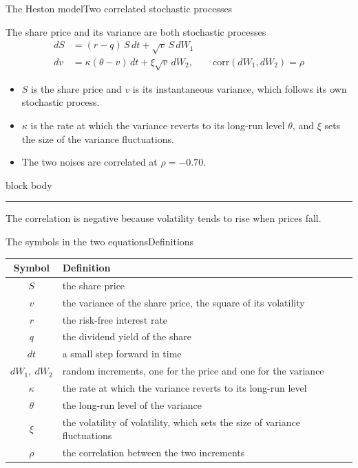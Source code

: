 \documentclass[aspectratio=169,11pt]{beamer}
\newcommand{\sigcallout}[1]{%
  \vfill
  \begin{beamercolorbox}[wd=\linewidth,sep=0.7em,rounded=true]{block body}
    {\color{sigblue}\rule{0.9ex}{0.9ex}}\hspace{0.5em}#1
  \end{beamercolorbox}%
}
\newcommand{\sigtable}[3]{%
  \begingroup
  \renewcommand{\arraystretch}{1.15}%
  \begin{table}\small
    \begin{tabular}{#1}
      \toprule
      #2 \\
      \midrule
      #3
      \bottomrule
    \end{tabular}
  \end{table}%
  \endgroup
}
\begin{document}
\begin{frame}{The Heston model}{Two correlated stochastic processes}
  \begin{block}{The share price and its variance are both stochastic processes}
    \vspace{-0.4em}
    \begin{align*}
      dS &= (r - q)\,S\,dt + \sqrt{v}\,S\,dW_1\\[0.1em]
      dv &= \kappa(\theta - v)\,dt + \xi\sqrt{v}\,dW_2,
        \qquad \mathrm{corr}(dW_1, dW_2) = \rho
    \end{align*}
    \vspace{-0.9em}
  \end{block}
  \begin{itemize}
    \item $S$ is the share price and $v$ is its instantaneous variance,
      which follows its own stochastic process.
    \item $\kappa$ is the rate at which the variance reverts to its
      long-run level $\theta$, and $\xi$ sets the size of the variance
      fluctuations.
    \item The two noises are correlated at $\rho = -0.70$.
  \end{itemize}
  \sigcallout{The correlation is negative because volatility tends to rise
    when prices fall.}
\end{frame}

\begin{frame}{The symbols in the two equations}{Definitions}
  \sigtable{cl}{\textbf{Symbol} & \textbf{Definition}}{%
    $S$ & the share price \\
    $v$ & the variance of the share price, the square of its volatility \\
    $r$ & the risk-free interest rate \\
    $q$ & the dividend yield of the share \\
    $dt$ & a small step forward in time \\
    $dW_1,\ dW_2$ & random increments, one for the price and one for the variance \\
    $\kappa$ & the rate at which the variance reverts to its long-run level \\
    $\theta$ & the long-run level of the variance \\
    $\xi$ & the volatility of volatility, which sets the size of variance fluctuations \\
    $\rho$ & the correlation between the two increments \\}
\end{frame}
\end{document}

